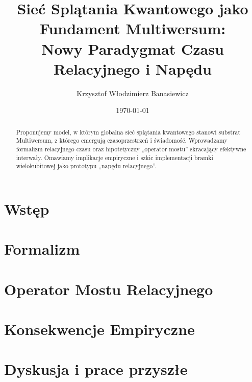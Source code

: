 \documentclass[11pt,a4paper]{article}
\title{Sieć Splątania Kwantowego jako Fundament Multiwersum:\\
Nowy Paradygmat Czasu Relacyjnego i Napędu}
\author[1]{Krzysztof Włodzimierz Banasiewicz}
\affil[1]{Independent Researcher, The Hague, Netherlands}
\date{\today}
\begin{document}
\maketitle

\begin{abstract}
Proponujemy model, w którym globalna sieć splątania kwantowego stanowi substrat Multiwersum, z którego emergują czasoprzestrzeń i świadomość. Wprowadzamy formalizm relacyjnego czasu oraz hipotetyczny „operator mostu” skracający efektywne interwały. Omawiamy implikacje empiryczne i szkic implementacji bramki wielokubitowej jako prototypu „napędu relacyjnego”.
\end{abstract}

\section{Wstęp}

\section{Formalizm}

\section{Operator Mostu Relacyjnego}

\section{Konsekwencje Empiryczne}

\section{Dyskusja i prace przyszłe}



\end{document}
